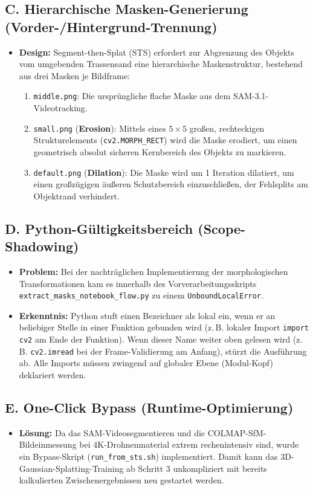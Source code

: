 \documentclass[11pt, a4paper]{article}
\begin{document}
\subsection{C. Hierarchische Masken-Generierung (Vorder-/Hintergrund-Trennung)}
\begin{itemize}
    \item \textbf{Design:} Segment-then-Splat (STS) erfordert zur Abgrenzung des Objekts vom umgebenden Trassensand eine hierarchische Maskenstruktur, bestehend aus drei Masken je Bildframe:
    \begin{enumerate}
        \item \texttt{middle.png}: Die urspr\"ungliche flache Maske aus dem SAM-3.1-Videotracking.
        \item \texttt{small.png} (\textbf{Erosion}): Mittels eines $5\times5$ gro\ss{}en, rechteckigen Strukturelements (\texttt{cv2.MORPH\_RECT}) wird die Maske erodiert, um einen geometrisch absolut sicheren Kernbereich des Objekts zu markieren.
        \item \texttt{default.png} (\textbf{Dilation}): Die Maske wird um 1 Iteration dilatiert, um einen gro\ss{}z\"ugigen \"au\ss{}eren Schutzbereich einzuschlie\ss{}en, der Fehlsplits am Objektrand verhindert.
    \end{enumerate}
\end{itemize}

\subsection{D. Python-G\"ultigkeitsbereich (Scope-Shadowing)}
\begin{itemize}
    \item \textbf{Problem:} Bei der nachtr\"aglichen Implementierung der morphologischen Transformationen kam es innerhalb des Vorverarbeitungsskripts \texttt{extract\_masks\_notebook_flow.py} zu einem \texttt{UnboundLocalError}.
    \item \textbf{Erkenntnis:} Python stuft einen Bezeichner als lokal ein, wenn er an beliebiger Stelle in einer Funktion gebunden wird (z.\,B. lokaler Import \texttt{import cv2} am Ende der Funktion). Wenn dieser Name weiter oben gelesen wird (z.\,B. \texttt{cv2.imread} bei der Frame-Validierung am Anfang), st\"urzt die Ausf\"uhrung ab. Alle Imports m\"ussen zwingend auf globaler Ebene (Modul-Kopf) deklariert werden.
\end{itemize}

\subsection{E. One-Click Bypass (Runtime-Optimierung)}
\begin{itemize}
    \item \textbf{L\"osung:} Da das SAM-Videosegmentieren und die COLMAP-SfM-Bildeinmessung bei 4K-Drohnenmaterial extrem rechenintensiv sind, wurde ein Bypass-Skript (\texttt{run\_from\_sts.sh}) implementiert. Damit kann das 3D-Gaussian-Splatting-Training ab Schritt 3 unkompliziert mit bereits kalkulierten Zwischenergebnissen neu gestartet werden.
\end{itemize}
\end{document}
